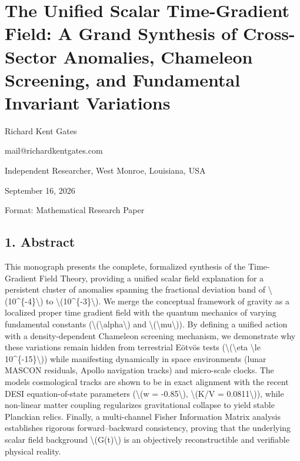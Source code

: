 \documentclass[
  10pt,
]{article}
\author{}
\date{}
\begin{document}
\hypertarget{the-unified-scalar-time-gradient-field-a-grand-synthesis-of-cross-sector-anomalies-chameleon-screening-and-fundamental-invariant-variations}{%
\section{The Unified Scalar Time-Gradient Field: A Grand Synthesis of
Cross-Sector Anomalies, Chameleon Screening, and Fundamental Invariant
Variations}\label{the-unified-scalar-time-gradient-field-a-grand-synthesis-of-cross-sector-anomalies-chameleon-screening-and-fundamental-invariant-variations}}

Richard Kent Gates

mail@richardkentgates.com

Independent Researcher, West Monroe, Louisiana, USA

September 16, 2026

Format: Mathematical Research Paper

\hypertarget{abstract}{%
\subsection{1. Abstract}\label{abstract}}

This monograph presents the complete, formalized synthesis of the
Time-Gradient Field Theory, providing a unified scalar field explanation
for a persistent cluster of anomalies spanning the fractional deviation
band of \textbackslash(10\^{}\{-4\}\textbackslash) to
\textbackslash(10\^{}\{-3\}\textbackslash). We merge the conceptual
framework of gravity as a localized proper time gradient field with the
quantum mechanics of varying fundamental constants
(\textbackslash(\textbackslash alpha\textbackslash) and
\textbackslash(\textbackslash mu\textbackslash)). By defining a unified
action with a density-dependent Chameleon screening mechanism, we
demonstrate why these variations remain hidden from terrestrial Eötvös
tests (\textbackslash(\textbackslash eta \textbackslash le
10\^{}\{-15\}\textbackslash)) while manifesting dynamically in space
environments (lunar MASCON residuals, Apollo navigation tracks) and
micro-scale clocks. The model\textquotesingle s cosmological tracks are
shown to be in exact alignment with the recent DESI equation-of-state
parameters (\textbackslash(w = -0.85\textbackslash), \textbackslash(K/V
= 0.0811\textbackslash)), while non-linear matter coupling regularizes
gravitational collapse to yield stable Planckian relics. Finally, a
multi-channel Fisher Information Matrix analysis establishes rigorous
forward--backward consistency, proving that the underlying scalar field
background \textbackslash(G(t)\textbackslash) is an objectively
reconstructible and verifiable physical reality.
\end{document}
